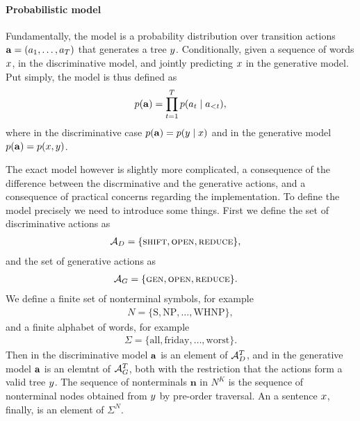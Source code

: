 

\paragraph{Probabilistic model}

Fundamentally, the model is a probability distribution over transition actions $\mathbf{a} = ( a_1, \dots, a_T )$ that generates a tree $y$. Conditionally, given a sequence of words $x$, in the discriminative model, and jointly predicting $x$ in the generative model. Put simply, the model is thus defined as
\begin{equation}
  \label{eq:naive-rnng-model}
  p( \mathbf{a} ) = \prod_{t=1}^T p( a_t \mid a_{<t} ),
\end{equation}
where in the discriminative case $p( \mathbf{a} ) = p( y \mid x )$ and in the generative model $p( \mathbf{a} ) = p( x, y )$.

The exact model however is slightly more complicated, a consequence of the difference between the discrminative and the generative actions, and a consequence of practical concerns regarding the implementation. To define the model precisely we need to introduce some things. First we define the set of discriminative actions as
\begin{align}
  \mathcal{A}_D &= \{ \textsc{shift}, \textsc{open}, \textsc{reduce} \},
\end{align}
and the set of generative actions as
\begin{align}
  \mathcal{A}_G &= \{ \textsc{gen}, \textsc{open}, \textsc{reduce} \}.
\end{align}
We define a finite set of nonterminal symbols, for example
\begin{align*}
  N = \{ \text{S}, \text{NP}, \dots, \text{WHNP}\},
\end{align*}
and a finite alphabet of words, for example
\begin{align*}
  \Sigma = \{ \text{all}, \text{friday}, \dots, \text{worst} \}.
\end{align*}
Then in the discriminative model $\mathbf{a}$ is an element of $\mathcal{A}_D^T$, and in the generative model $\mathbf{a}$ is an elemtnt of $\mathcal{A}_G^T$, both with the restriction that the actions form a valid tree $y$. The sequence of nonterminals $\mathbf{n}$ in $N^K$ is the sequence of nonterminal nodes obtained from $y$ by pre-order traversal. An a sentence $x$, finally, is an element of $\Sigma^N$.

